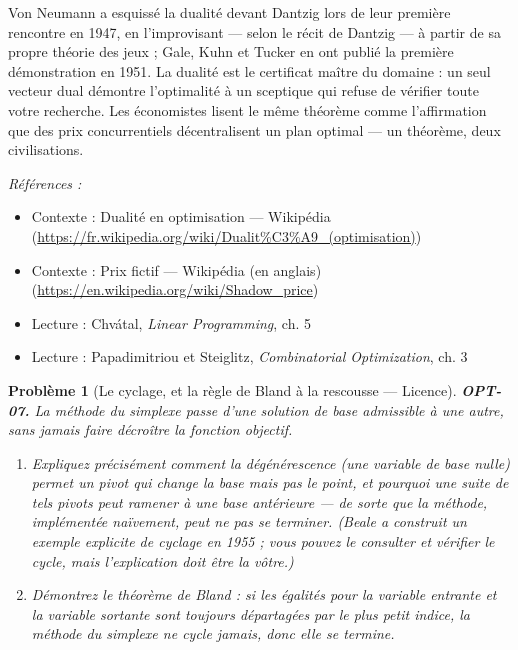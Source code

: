 \documentclass[11pt]{article}
\newtheorem{problem}{Problème}
\newenvironment{refs}{\par\small\noindent\emph{Références :}\begin{itemize}\setlength\itemsep{0pt}}{\end{itemize}\normalsize}
\begin{document}
\noindent Von Neumann a esquissé la dualité devant Dantzig lors de leur première rencontre en 1947, en l'improvisant --- selon le récit de Dantzig --- à partir de sa propre théorie des jeux ; Gale, Kuhn et Tucker en ont publié la première démonstration en 1951. La dualité est le certificat maître du domaine : un seul vecteur dual démontre l'optimalité à un sceptique qui refuse de vérifier toute votre recherche. Les économistes lisent le même théorème comme l'affirmation que des prix concurrentiels décentralisent un plan optimal --- un théorème, deux civilisations.

\begin{refs}
\item Contexte : Dualité en optimisation --- Wikipédia (\url{https://fr.wikipedia.org/wiki/Dualit%C3%A9_(optimisation)})
\item Contexte : Prix fictif --- Wikipédia (en anglais) (\url{https://en.wikipedia.org/wiki/Shadow_price})
\item Lecture : Chvátal, \textit{Linear Programming}, ch. 5
\item Lecture : Papadimitriou et Steiglitz, \textit{Combinatorial Optimization}, ch. 3
\end{refs}

\bigskip

\begin{problem}[{Le cyclage, et la règle de Bland à la rescousse --- Licence}]
\textbf{OPT-07.} La méthode du simplexe passe d'une solution de base admissible à une autre, sans jamais faire décroître la fonction objectif.
\begin{enumerate}
\item[(a)] Expliquez précisément comment la \textit{dégénérescence} (une variable de base nulle) permet un pivot qui change la base mais pas le point, et pourquoi une suite de tels pivots peut ramener à une base antérieure --- de sorte que la méthode, implémentée naïvement, peut ne pas se terminer. (Beale a construit un exemple explicite de cyclage en 1955 ; vous pouvez le consulter et vérifier le cycle, mais l'explication doit être la vôtre.)
\item[(b)] Démontrez le théorème de Bland : si les égalités pour la variable entrante et la variable sortante sont toujours départagées par le plus petit indice, la méthode du simplexe ne cycle jamais, donc elle se termine.
\end{enumerate}

\end{problem}
\end{document}

